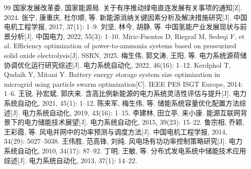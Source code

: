 \documentclass[a4paper]{neepumcm}
\begin{document}
\begin{thebibliography}{99}
 国家发展改革委, 国家能源局. 关于有序推动绿电直连发展有关事项的通知[Z]. 2024.
 张宁, 康重庆, 杜尔顺, 等. 新能源消纳关键因素分析及解决措施研究[J]. 中国电机工程学报, 2017, 37(1): 1--9.
 刘坚, 林今, 胡静, 等. 中国氢能产业发展现状与前景分析[J]. 中国电力, 2022, 55(3): 1--10.
 Miric-Fuentes D, Riegraf M, Sedeqi F, et al. Efficiency optimization of power-to-ammonia systems based on pressurized solid oxide electrolysis[J]. SSRN, 2025.
 梅生伟, 郭文涛, 王阳, 等. 电力系统源荷储协调优化运行研究综述[J]. 电力系统自动化, 2022, 46(16): 1--12.
 Kerdphol T, Qudaih Y, Mitani Y. Battery energy storage system size optimization in microgrid using particle swarm optimization[C]. IEEE PES ISGT Europe, 2014: 1--6.
 王锐, 孙宏斌, 郭庆来. 含高比例新能源的电力系统灵活性评估与提升[J]. 电力系统自动化, 2021, 45(1): 1--12.
 陈来军, 梅生伟, 等. 储能系统容量优化配置方法综述[J]. 电力系统自动化, 2019, 43(16): 1--15.
 李建林, 田立亭, 来小康. 能源互联网背景下的电力储能技术展望[J]. 电力系统自动化, 2015, 39(23): 15--22.
 鲁宗相, 乔颖, 王彩霞, 等. 风电并网中的功率预测与调度方法[J]. 中国电机工程学报, 2014, 34(29): 5027--5038.
 王伟胜, 范高锋, 刘纯. 风电场有功功率控制策略研究[J]. 电力系统自动化, 2010, 34(17): 87--92.
 丁明, 王敏, 等. 分布式发电系统中储能技术应用综述[J]. 电力系统自动化, 2013, 37(1): 14--22.
\end{thebibliography}

\begin{appendices}

\end{appendices}
\end{document}
